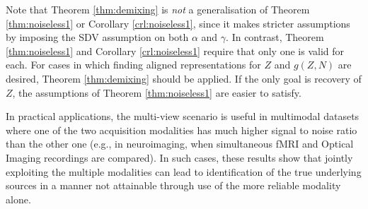 Note that Theorem \ref{thm:demixing} is \emph{not} a generalisation of Theorem \ref{thm:noiseless1} or Corollary \ref{crl:noiseless1}, since it makes stricter assumptions by imposing the SDV assumption on both ${\alpha}$ and ${\gamma}$.
In contrast, Theorem \ref{thm:noiseless1} and Corollary \ref{crl:noiseless1} require that only one is valid for each.
For cases in which finding aligned representations for ${Z}$ and ${g}({Z}, {N})$ are desired, Theorem \ref{thm:demixing} should be applied.
If the only goal is recovery of ${Z}$, the assumptions of Theorem \ref{thm:noiseless1} are easier to satisfy.


In practical applications, the multi-view scenario is useful in multimodal datasets where one of the two acquisition modalities has much higher signal to noise ratio than the other one (e.g., in neuroimaging, when simultaneous fMRI and Optical Imaging recordings are compared). In such cases,
these results show that jointly exploiting the multiple modalities can lead to identification of the true underlying sources in a manner not attainable through use of the more reliable modality alone.




